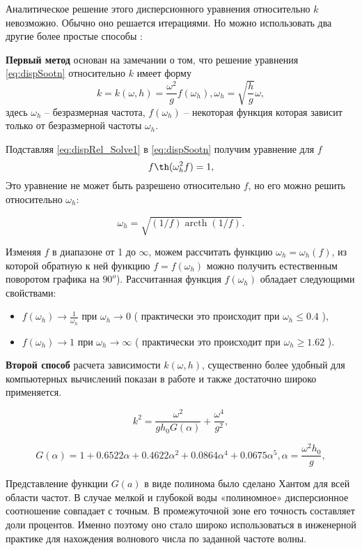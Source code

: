 Аналитическое решение этого дисперсионного уравнения относительно $k$ невозможно. Обычно оно решается итерациями. Но можно использовать два другие более простые способы\cite{kras} \cite{Zasl_Kras_2001}:

\textbf{Первый метод} основан на замечании о том, что решение уравнения \eqref{eq:dispSootn} относительно $k$ имеет форму
\begin{equation}\label{eq:dispRel_Solve1}
  k=k(\omega,h)=\frac{\omega^2}{g}f(\omega_h), \omega_h=\sqrt{\frac{h}{g}}\omega,
\end{equation}
здесь $\omega_h$ -- безразмерная частота, $f(\omega_h)$ -- некоторая функция которая зависит только от безразмерной частоты $\omega_h$.

Подставляя \eqref{eq:dispRel_Solve1} в \eqref{eq:dispSootn} получим уравнение для $f$
$$
f\th(\omega_h^2f)=1,
$$
Это уравнение не может быть разрешено относительно $f$, но его можно решить относительно $\omega_h$:

$$
\omega_h = \sqrt{(1/f)\operatorname{arcth}(1/f)}.
$$

Изменяя $f$ в диапазоне от 1 до $\infty$, можем рассчитать функцию $\omega_h=\omega_h(f)$, из которой обратную к ней функцию $f=f(\omega_h)$ можно получить естественным поворотом графика на $90^o$). Рассчитанная функция $f(\omega_h)$ обладает следующими свойствами:
\begin{itemize}
  \item $f(\omega_h)\rightarrow\frac{1}{\omega_h}$ при $\omega_h\rightarrow0$ ( практически это происходит при $\omega_h\leq0.4$ \cite{Zasl_Kras_2001}),
  \item $f(\omega_h)\rightarrow1$ при $\omega_h\rightarrow\infty$ ( практически это происходит при $\omega_h\geq1.62$ \cite{Zasl_Kras_2001}).
\end{itemize}

\textbf{Второй способ} расчета зависимости $k(\omega,h)$, существенно более удобный для компьютерных вычислений показан в работе \cite{hunt} и также достаточно широко применяется.

\begin{equation}\label{eq:hantApprox}
  k^2=\frac{\omega^2}{gh_0G(\alpha)}+\frac{\omega^4}{g^2},
\end{equation}

$$
G(\alpha)=1+0.6522\alpha+0.4622\alpha^2+0.0864\alpha^4+0.0675\alpha^5, \alpha=\frac{\omega^2h_0}{g},
$$

Представление функции $G(a)$ в виде полинома было сделано Хантом \cite{hunt} для всей области частот. В случае мелкой и глубокой воды «полиномное» дисперсионное соотношение совпадает с точным. В промежуточной зоне его точность составляет доли процентов. Именно поэтому оно стало широко использоваться в инженерной практике для нахождения волнового числа по заданной частоте волны.

